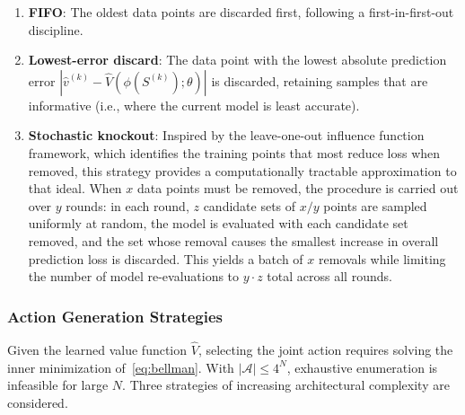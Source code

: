 \documentclass[3p, twocolumn]{elsarticle}
\begin{document}
\begin{enumerate}
    \item \textbf{FIFO}: The oldest data points are discarded first, following a first-in-first-out discipline.
    
    \item \textbf{Lowest-error discard}: The data point with the lowest absolute prediction error $|\hat{v}^{(k)} - \hat{V}(\phi(S^{(k)}); \theta)|$ is discarded, retaining samples that are informative (i.e., where the current model is least accurate).
    
    \item \textbf{Stochastic knockout}: Inspired by the leave-one-out influence function framework, which identifies the training points that most reduce loss when removed, this strategy provides a computationally tractable approximation to that ideal. When $x$ data points must be removed, the procedure is carried out over $y$ rounds: in each round, $z$ candidate sets of $x/y$ points are sampled uniformly at random, the model is evaluated with each candidate set removed, and the set whose removal causes the smallest increase in overall prediction loss is discarded. This yields a batch of $x$ removals while limiting the number of model re-evaluations to $y \cdot z$ total across all rounds.
\end{enumerate}

\subsubsection{Action Generation Strategies}
\label{subsubsec:action_generation}

Given the learned value function $\hat{V}$, selecting the joint action requires solving the inner minimization of~\eqref{eq:bellman}. With $|\mathcal{A}| \leq 4^N$, exhaustive enumeration is infeasible for large $N$. Three strategies of increasing architectural complexity are considered.
\end{document}
